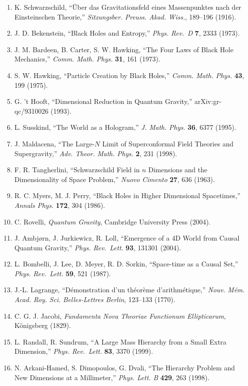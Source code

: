 \documentclass[a4paper,11pt]{article}
\theoremstyle{definition}
\providecommand{\tightlist}{\setlength{\itemsep}{0pt}\setlength{\parskip}{0pt}}
\begin{document}
\begin{enumerate}
\def\labelenumi{\arabic{enumi}.}
\tightlist
\item
  K. Schwarzschild, ``Über das Gravitationsfeld eines Massenpunktes nach
  der Einsteinschen Theorie,'' \emph{Sitzungsber. Preuss. Akad. Wiss.},
  189--196 (1916).
\item
  J. D. Bekenstein, ``Black Holes and Entropy,'' \emph{Phys. Rev.~D}
  \textbf{7}, 2333 (1973).
\item
  J. M. Bardeen, B. Carter, S. W. Hawking, ``The Four Laws of Black Hole
  Mechanics,'' \emph{Comm. Math. Phys.} \textbf{31}, 161 (1973).
\item
  S. W. Hawking, ``Particle Creation by Black Holes,'' \emph{Comm. Math.
  Phys.} \textbf{43}, 199 (1975).
\item
  G. 't Hooft, ``Dimensional Reduction in Quantum Gravity,''
  arXiv:gr-qc/9310026 (1993).
\item
  L. Susskind, ``The World as a Hologram,'' \emph{J. Math. Phys.}
  \textbf{36}, 6377 (1995).
\item
  J. Maldacena, ``The Large-\(N\) Limit of Superconformal Field Theories
  and Supergravity,'' \emph{Adv. Theor. Math. Phys.} \textbf{2}, 231
  (1998).
\item
  F. R. Tangherlini, ``Schwarzschild Field in \(n\) Dimensions and the
  Dimensionality of Space Problem,'' \emph{Nuovo Cimento} \textbf{27},
  636 (1963).
\item
  R. C. Myers, M. J. Perry, ``Black Holes in Higher Dimensional
  Spacetimes,'' \emph{Annals Phys.} \textbf{172}, 304 (1986).
\item
  C. Rovelli, \emph{Quantum Gravity}, Cambridge University Press (2004).
\item
  J. Ambjørn, J. Jurkiewicz, R. Loll, ``Emergence of a 4D World from
  Causal Quantum Gravity,'' \emph{Phys. Rev.~Lett.} \textbf{93}, 131301
  (2004).
\item
  L. Bombelli, J. Lee, D. Meyer, R. D. Sorkin, ``Space-time as a Causal
  Set,'' \emph{Phys. Rev.~Lett.} \textbf{59}, 521 (1987).
\item
  J.-L. Lagrange, ``Démonstration d'un théorème d'arithmétique,''
  \emph{Nouv. Mém. Acad. Roy. Sci. Belles-Lettres Berlin}, 123--133
  (1770).
\item
  C. G. J. Jacobi, \emph{Fundamenta Nova Theoriae Functionum
  Ellipticarum}, Königsberg (1829).
\item
  L. Randall, R. Sundrum, ``A Large Mass Hierarchy from a Small Extra
  Dimension,'' \emph{Phys. Rev.~Lett.} \textbf{83}, 3370 (1999).
\item
  N. Arkani-Hamed, S. Dimopoulos, G. Dvali, ``The Hierarchy Problem and
  New Dimensions at a Millimeter,'' \emph{Phys. Lett. B} \textbf{429},
  263 (1998).
\end{enumerate}
\end{document}
